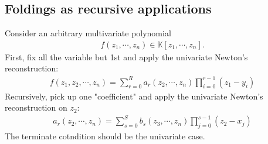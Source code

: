 \documentclass[11pt]{book}
\begin{document}
\subsection{Foldings as recursive applications}
Consider an arbitrary multivariate polynomial
\begin{eqnarray}
f(z_1,\cdots, z_n) \in \mathbb{K}[z_1,\cdots, z_n].
\end{eqnarray}
First, fix all the variable but 1st and apply the univariate Newton's reconstruction:
\begin{eqnarray}
f(z_1, z_2, \cdots, z_n) = \sum_{r=0}^R a_r (z_2,\cdots, z_n) \prod_{i=0}^{r-1}(z_1 - y_i)
\end{eqnarray}
Recursively, pick up one "coefficient" and apply the univariate Newton's reconstruction on $z_2$:
\begin{eqnarray}
a_r(z_2, \cdots, z_n) = \sum_{s=0}^{S} b_s (z_3,\cdots, z_n) \prod_{j=0}^{s-1}(z_2 - x_j)
\end{eqnarray}
The terminate cotndition should be the univariate case.
\end{document}
